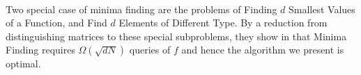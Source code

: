 \paragraph{}
Two special case of minima finding are the problems of Finding $d$ Smallest Values of a Function, and Find $d$ Elements of Different Type. By a reduction from distinguishing matrices to these special subproblems, they show in \cite{durr2004quantum} that Minima Finding requires $\Omega(\sqrt{dN})$ queries of $f$ and hence the algorithm we present is optimal. 